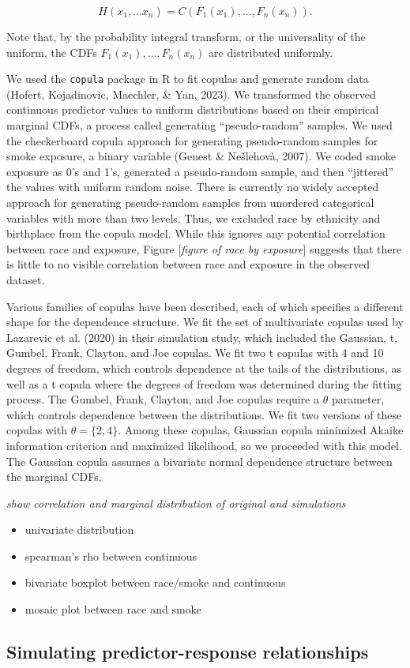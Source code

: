 \documentclass[12pt, twoside]{amherstthesis}
\providecommand{\tightlist}{%
  \setlength{\itemsep}{0pt}\setlength{\parskip}{0pt}}
\begin{document}
\[
H(x_1, \dots x_n)=C(F_1(x_1), \dots, F_n(x_n)).
\]

\noindent Note that, by the probability integral transform, or the universality of the uniform, the CDFs \(F_1(x_1), \dots, F_n(x_n)\) are distributed uniformly.

We used the \texttt{copula} package in R to fit copulas and generate random data (Hofert, Kojadinovic, Maechler, \& Yan, 2023). We transformed the observed continuous predictor values to uniform distributions based on their empirical marginal CDFs, a process called generating ``pseudo-random'' samples. We used the checkerboard copula approach for generating pseudo-random samples for smoke exposure, a binary variable (Genest \& Nešlehovà, 2007). We coded smoke exposure as 0's and 1's, generated a pseudo-random sample, and then ``jittered'' the values with uniform random noise. There is currently no widely accepted approach for generating pseudo-random samples from unordered categorical variables with more than two levels. Thus, we excluded race by ethnicity and birthplace from the copula model. While this ignores any potential correlation between race and exposure, Figure {[}\emph{figure of race by exposure}{]} suggests that there is little to no visible correlation between race and exposure in the observed dataset.

Various families of copulas have been described, each of which specifies a different shape for the dependence structure. We fit the set of multivariate copulas used by Lazarevic et al. (2020) in their simulation study, which included the Gaussian, t, Gumbel, Frank, Clayton, and Joe copulas. We fit two t copulas with 4 and 10 degrees of freedom, which controls dependence at the tails of the distributions, as well as a t copula where the degrees of freedom was determined during the fitting process. The Gumbel, Frank, Clayton, and Joe copulas require a \(\theta\) parameter, which controls dependence between the distributions. We fit two versions of these copulas with \(\theta=\{2, 4\}\). Among these copulas, Gaussian copula minimized Akaike information criterion and maximized likelihood, so we proceeded with this model. The Gaussian copula assumes a bivariate normal dependence structure between the marginal CDFs.

\emph{show correlation and marginal distribution of original and simulations}
\begin{itemize}
\tightlist
\item
  univariate distribution
\item
  spearman's rho between continuous
\item
  bivariate boxplot between race/smoke and continuous
\item
  mosaic plot between race and smoke
\end{itemize}
\hypertarget{simresp}{%
\subsection{Simulating predictor-response relationships}\label{simresp}}
\end{document}
